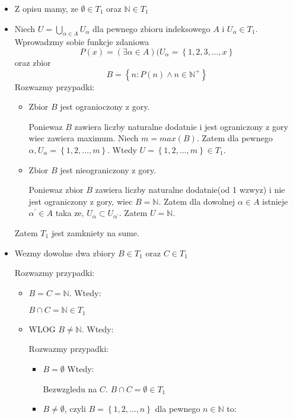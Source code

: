 \documentclass{article}
\begin{document}
\begin{enumerate}
\begin{itemize}%
    
\item Z opisu mamy, ze $\emptyset \in T_{1}$ oraz $\mathbb{N} \in T_{1}$
\item Niech $U = \bigcup\limits_{\alpha \in A}U_{\alpha}$ dla pewnego zbioru indeksowego $A$ i $U_{\alpha} \in T_{1}$. Wprowadzmy sobie funkcje zdaniowa
$$P(x) = (\exists \alpha \in A)(U_{\alpha} = \left\{1,2,3,\dots,x\right\}$$
oraz zbior
$$B = \left\{n: P(n) \land n \in {\mathbb{N}}^{+}\right\}$$
Rozwazmy przypadki:
\begin{itemize}%
   
\item Zbior $B$ jest ogranioczony z gory.

Poniewaz $B$ zawiera liczby naturalne dodatnie i jest ograniczony z gory wiec
zawiera maximum. Niech $m = max(B)$. Zatem dla pewnego $\alpha, U_{\alpha} = \left\{1,2,\dots,m\right\}$. Wtedy $U = \left\{1,2,\dots,m\right\} \in T_{1}$.
\item Zbior $B$ jest nieograniczony z gory.

Poniewaz zbior $B$ zawiera liczby naturalne dodatnie(od 1 wzwyz) i nie jest ograniczony z gory, wiec $B = \mathbb{N}$. Zatem dla dowolnej $\alpha \in A$ istnieje ${\alpha}^{\prime} \in A$ taka ze, $U_{\alpha} \subset U_{{\alpha}^{\prime}}$. Zatem $U = \mathbb{N}$.
\end{itemize}%
Zatem $T_{1}$ jest zamkniety na sume.
\item Wezmy dowolne dwa zbiory $B \in T_{1}$ oraz $C \in T_{1}$

Rozwazmy przypadki:
\begin{itemize}%
    
\item $B = C = \mathbb{N}$. Wtedy:

$B\cap C = \mathbb{N} \in T_{1}$
\item WLOG $B \neq \mathbb{N}$. Wtedy:

Rozwazmy przypadki:
\begin{itemize}%

\item $B = \emptyset$ Wtedy:

Bezwzgledu na $C$. $B\cap C = \emptyset \in T_{1}$
\item $B \neq \emptyset$, czyli $B = \left\{1,2,\dots,n\right\}$ dla pewnego $n \in \mathbb{N}$ to:


\end{itemize}
\end{itemize}
\end{itemize}
\end{enumerate}
\end{document}
